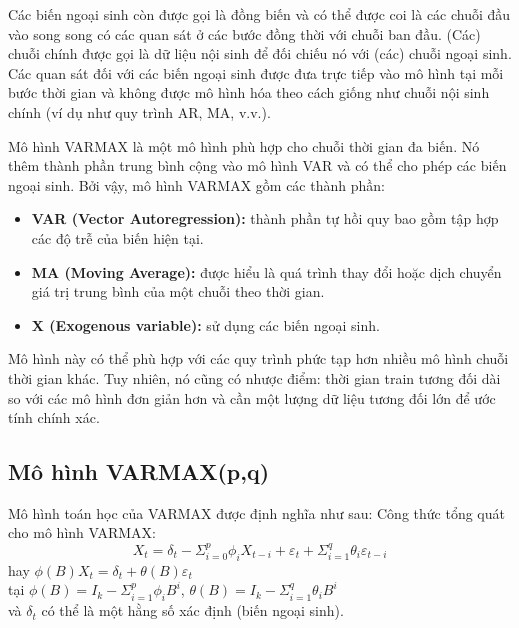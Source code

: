 Các biến ngoại sinh còn được gọi là đồng biến và có thể được coi là các chuỗi đầu vào song song có các quan sát ở các bước đồng thời với chuỗi ban đầu. (Các) chuỗi chính được gọi là dữ liệu nội sinh để đối chiếu nó với (các) chuỗi ngoại sinh. Các quan sát đối với các biến ngoại sinh được đưa trực tiếp vào mô hình tại mỗi bước thời gian và không được mô hình hóa theo cách giống như chuỗi nội sinh chính (ví dụ như quy trình AR, MA, v.v.).

Mô hình VARMAX là một mô hình phù hợp cho chuỗi thời gian đa biến. Nó thêm thành phần trung bình cộng vào mô hình VAR và có thể cho phép các biến ngoại sinh. Bởi vậy, mô hình VARMAX gồm các thành phần:
\begin{itemize}
    \item \textbf{VAR (Vector Autoregression):} thành phần tự hồi quy bao gồm tập hợp các độ trễ của biến hiện tại.
    \item \textbf{MA (Moving Average):} được hiểu là quá trình thay đổi hoặc dịch chuyển giá trị trung bình của một chuỗi theo thời gian.
    \item \textbf{X (Exogenous variable):} sử dụng các biến ngoại sinh.
\end{itemize}
Mô hình này có thể phù hợp với các quy trình phức tạp hơn nhiều mô hình chuỗi thời gian khác. Tuy nhiên, nó cũng có nhược điểm: thời gian train tương đối dài so với các mô hình đơn giản hơn và cần một lượng dữ liệu tương đối lớn để ước tính chính xác.

\subsection{Mô hình VARMAX(p,q)}
Mô hình toán học của VARMAX được định nghĩa như sau:
Công thức tổng quát cho mô hình VARMAX:
        $$X_t = \delta_t - \Sigma_{i=0}^p\phi_i X_{t-i} + \varepsilon_t + \Sigma_{i=1}^q \theta_i \varepsilon_{t-i}$$
        hay $\phi(B)X_t = \delta_t + \theta(B)\varepsilon_t$ \\
        tại $\phi(B) = I_k - \Sigma^p_{i=1}\phi_i B^i$, $\theta(B)=I_k-\Sigma^q_{i=1}\theta_i B^i$ \\
        và $\delta_t$ có thể là một hằng số xác định (biến ngoại sinh).


